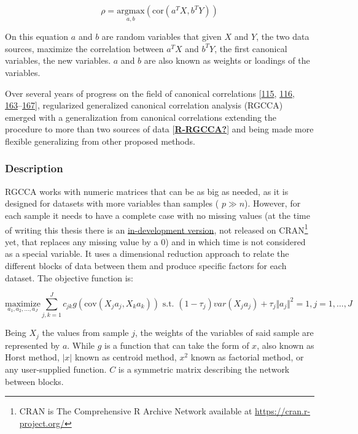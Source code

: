 \documentclass[
  12pt,
  a4paper,
  twoside,
  openright]{book}
\begin{document}
\[
\rho = \underset{a, b}{\text{argmax}} (\text{cor}(a^T X, b^T Y))
\]

On this equation \(a\) and \(b\) are random variables that given \(X\) and \(Y\), the two data sources, maximize the correlation between \(a^T X\) and \(b^T Y\), the first canonical variables, the new variables.
\(a\) and \(b\) are also known as weights or loadings of the variables.

Over several years of progress on the field of canonical correlations {[}\protect\hyperlink{ref-tenenhaus_regularized_2011}{115}, \protect\hyperlink{ref-tenenhaus_variable_2014}{116}, \protect\hyperlink{ref-tenenhaus_component-based_2008}{163}--\protect\hyperlink{ref-gloaguen2020}{167}{]}, regularized generalized canonical correlation analysis (RGCCA) emerged with a generalization from canonical correlations extending the procedure to more than two sources of data {[}\protect\hyperlink{ref-R-RGCCA}{\textbf{R-RGCCA?}}{]} and being made more flexible generalizing from other proposed methods.

\hypertarget{description}{%
\subsubsection{Description}\label{description}}

RGCCA works with numeric matrices that can be as big as needed, as it is designed for datasets with more variables than samples ( \(p \gg n\)).
However, for each sample it needs to have a complete case with no missing values (at the time of writing this thesis there is an \href{https://github.com/rgcca-factory/RGCCA/tree/CRAN}{in-development version}, not released on CRAN\footnote{CRAN is The Comprehensive R Archive Network available at \url{https://cran.r-project.org/}} yet, that replaces any missing value by a 0) and in which time is not considered as a special variable.
It uses a dimensional reduction approach to relate the different blocks of data between them and produce specific factors for each dataset.
The objective function is:

\[
\underset{a_1,a_2, \dots,a_J}{\text{maximize}} \sum_{j, k = 1}^J c_{jk} g( \text{cov}(X_j a_j, X_k a_k)) \text{ s.t. } (1-\tau_j)var(X_j a_j)+\tau_j \Vert a_j \Vert^2 = 1, j=1, \ldots, J
\]

Being \(X_j\) the values from sample \(j\), the weights of the variables of said sample are represented by \(a\).
While \(g\) is a function that can take the form of \(x\), also known as Horst method, \(|x|\) known as centroid method, \(x^2\) known as factorial method, or any user-supplied function.
\(C\) is a symmetric matrix describing the network between blocks.
\end{document}
